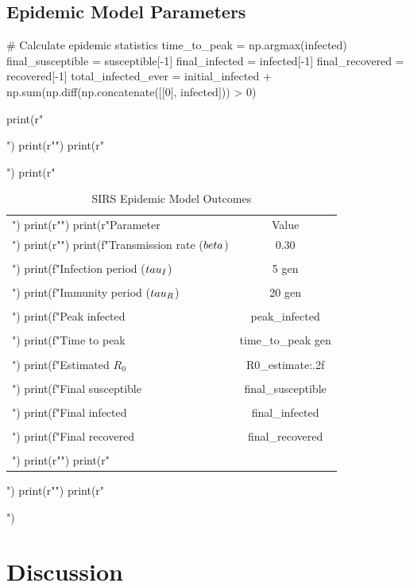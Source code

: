 \documentclass[a4paper, 11pt]{article}
\begin{document}
\subsection{Epidemic Model Parameters}

\begin{pycode}
# Calculate epidemic statistics
time_to_peak = np.argmax(infected)
final_susceptible = susceptible[-1]
final_infected = infected[-1]
final_recovered = recovered[-1]
total_infected_ever = initial_infected + np.sum(np.diff(np.concatenate([[0], infected])) > 0)

print(r"\begin{table}[htbp]")
print(r"\centering")
print(r"\caption{SIRS Epidemic Model Outcomes}")
print(r"\begin{tabular}{lc}")
print(r"\toprule")
print(r"Parameter & Value \\")
print(r"\midrule")
print(f"Transmission rate ($\\beta$) & 0.30 \\\\")
print(f"Infection period ($\\tau_I$) & 5 gen \\\\")
print(f"Immunity period ($\\tau_R$) & 20 gen \\\\")
print(f"Peak infected & {peak_infected} \\\\")
print(f"Time to peak & {time_to_peak} gen \\\\")
print(f"Estimated $R_0$ & {R0_estimate:.2f} \\\\")
print(f"Final susceptible & {final_susceptible} \\\\")
print(f"Final infected & {final_infected} \\\\")
print(f"Final recovered & {final_recovered} \\\\")
print(r"\bottomrule")
print(r"\end{tabular}")
print(r"\label{tab:epidemic}")
print(r"\end{table}")
\end{pycode}

\section{Discussion}
\end{document}
